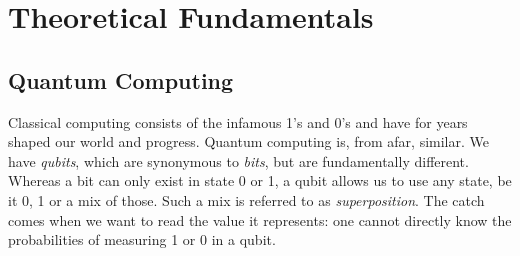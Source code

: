\chapter{Theoretical Fundamentals} %

\label{chapter:theoretical_fundamentals} %

\def \figwidth {215pt}



\section{Quantum Computing}
Classical computing consists of the infamous 1's and 0's and have for years shaped our world and progress. Quantum computing is, from afar, similar. We have \emph{qubits}, which are synonymous to \emph{bits}, but are fundamentally different. Whereas a bit can only exist in state 0 or 1, a qubit allows us to use any state, be it 0, 1 or a mix of those. Such a mix is referred to as \emph{superposition}. The catch comes when we want to read the value it represents: one cannot directly know the probabilities of measuring 1 or 0 in a qubit.



